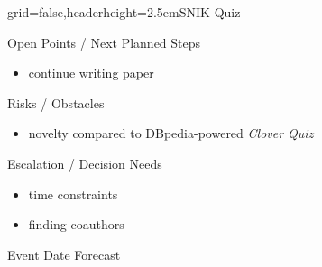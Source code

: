 \documentclass[english]{kiesgrube}
\begin{document}
\begin{poster}{grid=false,headerheight=2.5em}{}{SNIK Quiz}{}{}
\begin{posterbox}[name=open,column=1,row=0]{Open Points / Next Planned Steps}
\begin{itemize}
\item continue writing paper
\end{itemize}
\end{posterbox}
\begin{posterbox}[name=risks,column=1,below=open]{Risks / Obstacles}
\begin{itemize}
\item novelty compared to DBpedia-powered \emph{Clover Quiz}
\end{itemize}
\end{posterbox}
\begin{posterbox}[name=escalation,column=1,below=risks]{Escalation / Decision Needs}
\begin{itemize}
\item time constraints 
\item finding coauthors 
\end{itemize}
\end{posterbox}
\begin{posterbox}[name=event,below=escalation,column=1]{Event Date Forecast}
\end{posterbox}
\footer{}
\end{poster}

\newpage
\end{document}
